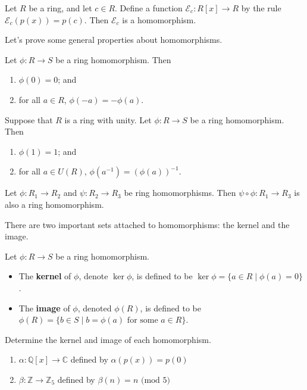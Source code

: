 \begin{theorem}\label{thm.EvalHom}
Let $R$ be a ring, and let $c\in R$. Define a function $\mathcal{E}_c:R[x] \rightarrow R$ by the rule $\mathcal{E}_c(p(x)) = p(c)$. Then $\mathcal{E}_c$ is a homomorphism.
\end{theorem}

Let's prove some general properties about homomorphisms.

\begin{theorem}
Let $\phi:R\to S$  be a ring homomorphism. Then 
\begin{enumerate}
\item $\phi(0) = 0$; and
\item for all $a\in R$, $\phi(-a) = -\phi(a)$.
\end{enumerate}
\end{theorem}

\begin{theorem}
Suppose that $R$ is a ring with unity. Let $\phi:R\to S$  be a ring homomorphism.  Then 
\begin{enumerate}
\item $\phi(1) = 1$; and
\item for all $a\in U(R)$, $\phi(a^{-1}) = (\phi(a))^{-1}$.
\end{enumerate}
\end{theorem}

\begin{theorem}
Let $\phi:R_1\to R_2$ and $\psi:R_2\to R_3$ be ring homomorphisms. Then $\psi\circ\phi:R_1 \to R_3$ is also a ring homomorphism.
\end{theorem}

There are two  important sets attached to homomorphisms: the kernel and the image.

\begin{definition}
Let $\phi:R\to S$ be a ring homomorphism. 
\begin{itemize}
\item The \textbf{kernel} of $\phi$, denote $\ker \phi$, is defined to be $\ker \phi=\{a\in R\mid \phi(a)=0\}$. 
\item The \textbf{image} of $\phi$, denoted  $\phi(R)$, is defined to be $\phi(R)=\{b\in S\mid b=\phi(a) \text{ for some $a\in R$}\}$.
\end{itemize}
\end{definition}

\begin{problem}\label{prob.KernelImageConcrete}
Determine the kernel and image of each homomorphism.
\begin{enumerate}
\item $\alpha: \mathbb{Q}[x] \rightarrow \mathbb{C}$ defined by $\alpha(p(x)) = p(0)$
\item $\beta: \mathbb{Z} \rightarrow \mathbb{Z}_5$ defined by $\beta(n) = n \text{ (mod $5$)}$
\end{enumerate}
\end{problem}

